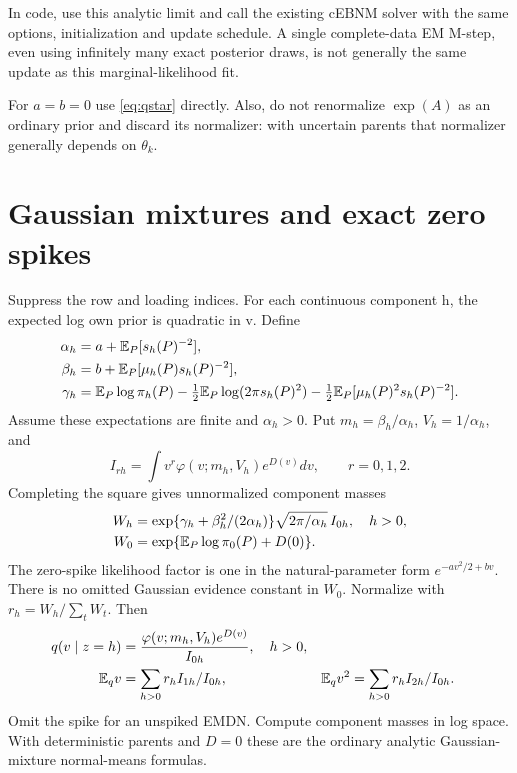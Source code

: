 \documentclass[11pt,a4paper]{article}
\newcommand{\E}{\mathbb E}
\newcommand{\Normal}[3]{\varphi(#1;#2,#3)}
\begin{document}
In code, use this analytic limit and call the existing cEBNM solver with
the same options, initialization and update schedule. A single
complete-data EM M-step, even using infinitely many exact posterior draws,
is not generally the same update as this marginal-likelihood fit.

For \(a=b=0\) use \eqref{eq:qstar} directly. Also, do not renormalize \(\exp(A)\)
as an ordinary prior and discard its normalizer: with uncertain parents
that normalizer generally depends on \(\theta_k\).

\clearpage
\section{Gaussian mixtures and exact zero spikes}
Suppress the row and loading indices. For each continuous component h,
the expected log own prior is quadratic in v. Define
\begin{align}
\alpha_h&=a+\E_P[s_h(P)^{-2}],\notag\\
\beta_h&=b+\E_P[\mu_h(P)s_h(P)^{-2}],\notag\\
\gamma_h&=\E_P\log\pi_h(P)-\tfrac12\E_P\log(2\pi s_h(P)^2)
-\tfrac12\E_P[\mu_h(P)^2s_h(P)^{-2}].
\label{eq:abc}
\end{align}
Assume these expectations are finite and \(\alpha_h>0\). Put
\(m_h=\beta_h/\alpha_h\), \(V_h=1/\alpha_h\), and
\begin{equation}
I_{rh}=\int v^r\Normal{v}{m_h}{V_h}e^{D(v)}dv,
\qquad r=0,1,2.
\label{eq:integrals}
\end{equation}
Completing the square gives unnormalized component masses
\begin{align}
W_h&=\exp\{\gamma_h+\beta_h^2/(2\alpha_h)\}
\sqrt{2\pi/\alpha_h}\,I_{0h},\quad h>0,\notag\\
W_0&=\exp\{\E_P\log\pi_0(P)+D(0)\}.
\label{eq:weights}
\end{align}
The zero-spike likelihood factor is one in the natural-parameter form
\(e^{-av^2/2+bv}\). There is no omitted Gaussian evidence constant in \(W_0\).
Normalize with \(r_h=W_h/\sum_tW_t\). Then
\begin{align}
q(v\mid z=h)&=\frac{\Normal{v}{m_h}{V_h}e^{D(v)}}{I_{0h}},\quad h>0,
\notag\\
\E_qv&=\sum_{h>0}r_hI_{1h}/I_{0h},&
\E_qv^2&=\sum_{h>0}r_hI_{2h}/I_{0h}.
\label{eq:moments}
\end{align}
Omit the spike for an unspiked EMDN. Compute component masses in log
space. With deterministic parents and \(D=0\) these are the ordinary analytic
Gaussian-mixture normal-means formulas.
\end{document}

